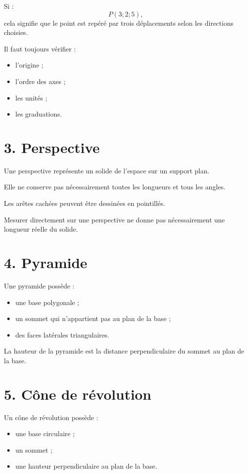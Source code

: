 Si :
\[
P(3;2;5),
\]
cela signifie que le point est repéré par trois déplacements selon les directions choisies.

Il faut toujours vérifier :
\begin{itemize}
\item l'origine ;
\item l'ordre des axes ;
\item les unités ;
\item les graduations.
\end{itemize}

\section{3. Perspective}

Une perspective représente un solide de l'espace sur un support plan.

Elle ne conserve pas nécessairement toutes les longueurs et tous les angles.

Les arêtes cachées peuvent être dessinées en pointillés.

\begin{attention}
Mesurer directement sur une perspective ne donne pas nécessairement une longueur réelle du solide.
\end{attention}

\section{4. Pyramide}

Une pyramide possède :
\begin{itemize}
\item une base polygonale ;
\item un sommet qui n'appartient pas au plan de la base ;
\item des faces latérales triangulaires.
\end{itemize}

La hauteur de la pyramide est la distance perpendiculaire du sommet au plan de la base.

\section{5. Cône de révolution}

Un cône de révolution possède :
\begin{itemize}
\item une base circulaire ;
\item un sommet ;
\item une hauteur perpendiculaire au plan de la base.
\end{itemize}

